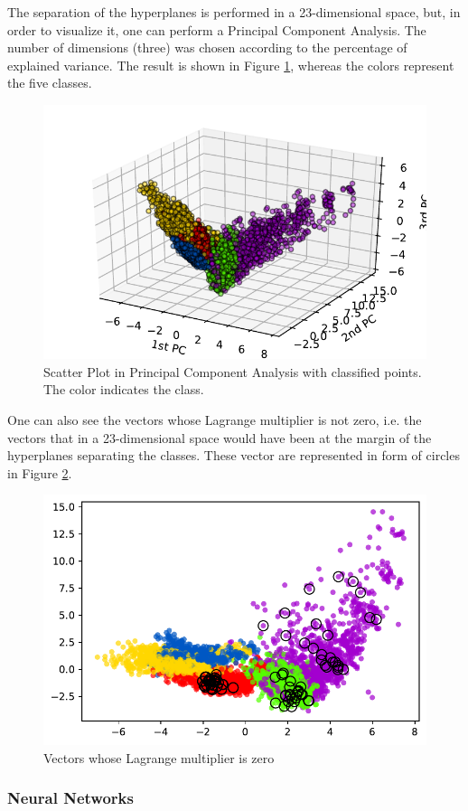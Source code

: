 \documentclass[10pt, a4paper, twocolumn]{article}
\begin{document}
The separation of the hyperplanes is performed in a 23-dimensional space, but, in order to visualize it, one can perform a Principal Component Analysis. The number of dimensions (three) was chosen according to the percentage of explained variance. The result is shown in Figure \ref{fig:pca_svm}, whereas the colors represent the five classes.

\begin{figure}
    \centering
    \includegraphics[width=0.8\columnwidth]{pca_svm.pdf}
    \caption{Scatter Plot in Principal Component Analysis with classified points. The color indicates the class.}
    \label{fig:pca_svm}
\end{figure}

One can also see the vectors whose Lagrange multiplier is not zero, i.e. the vectors that in a 23-dimensional space would have been at the margin of the hyperplanes separating the classes. These vector are represented in form of circles in Figure \ref{fig:vector}. 

\begin{figure}[h]
    \centering
    \includegraphics[width=0.6\columnwidth]{vectors.pdf}
    \caption{Vectors whose Lagrange multiplier is zero}
    \label{fig:vector}
\end{figure}

\subsubsection*{Neural Networks}
\end{document}
